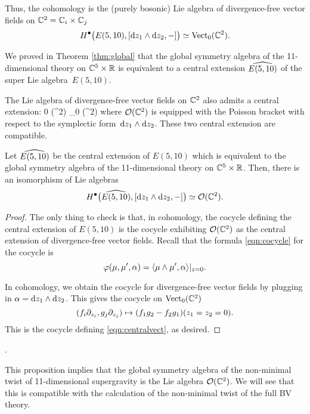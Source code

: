 Thus, the cohomology is the (purely bosonic) Lie algebra of divergence-free vector fields on $\CC^2 = \CC_i \times \CC_j$
\[
H^\bu\big(E(5,10), [\d z_1 \wedge \d z_2, -] \big) \simeq \Vect_0(\CC^2) .
\]

We proved in Theorem \ref{thm:global} that the global symmetry algebra of the 11-dimensional theory on $\CC^5 \times \RR$ is equivalent to a central extension $\Hat{E(5,10)}$ of the super Lie algebra~$E(5,10)$. 

The Lie algebra of divergence-free vector fields on $\CC^2$ also admits a central extension:
\beqn\label{eqn:centralvect}
0 \to \CC \to \cO (\CC^2) \to \Vect_0 (\CC^2) 
\eeqn
where $\cO(\CC^2)$ is equipped with the Poisson bracket with respect to the symplectic form~$\d z_1 \wedge \d z_2$.
These two central extension are compatible. 


\begin{prop}
Let $\Hat{E(5,10)}$ be the central extension of $E(5,10)$ which is equivalent to the global symmetry algebra of the 11-dimensional theory on $\CC^5 \times \RR$. 
Then, there is an isomorphism of Lie algebras 
\[
H^\bu \big(\Hat{E(5,10)} , [\d z_1 \wedge \d z_2, -] \big) \simeq \cO(\CC^2) .
\]
\end{prop}
\begin{proof}
The only thing to check is that, in cohomology, the cocycle defining the central extension of $E(5,10)$ is the cocycle exhibiting $\cO(\CC^2)$ as the central extension of divergence-free vector fields. 
Recall that the formula \eqref{eqn:cocycle} for the cocycle is 
\[
\varphi(\mu, \mu', \alpha) = \<\mu \wedge \mu', \alpha\>|_{z=0}.
\]

In cohomology, we obtain the cocycle for divergence-free vector fields by plugging in $\alpha = \d z_1 \wedge \d z_2$. 
This gives the cocycle on $\Vect_0(\CC^2)$ 
\[
(f_i \del_{z_i}, g_j \del_{z_j}) \mapsto (f_1 g_2 - f_2 g_1)(z_1=z_2=0) .
\]
This is the cocycle defining \eqref{eqn:centralvect}, as desired. 
\end{proof}.

This proposition implies that the global symmetry algebra of the non-minimal twist of 11-dimensional supergravity is the Lie algebra $\cO(\CC^2)$. 
We will see that this is compatible with the calculation of the non-minimal twist of the full BV theory. 

